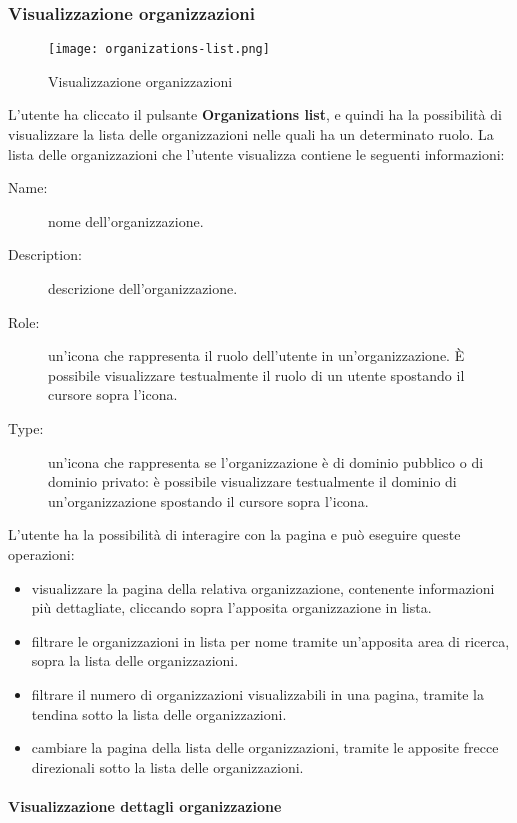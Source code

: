 \documentclass[../manuale-utente.tex]{subfiles}
\begin{document}
\subsubsection{Visualizzazione organizzazioni}%
\label{subs:visualizzazione_organizzazioni}

\begin{figure}[H]
    \centering
    \texttt{[image: organizations-list.png]}
    \caption{Visualizzazione organizzazioni}%
    \label{fig:web_app_visualizzazione_organizzazioni}
\end{figure}
L'utente ha cliccato il pulsante \textbf{Organizations list}, e quindi ha la possibilità di visualizzare la lista delle organizzazioni nelle quali ha un determinato ruolo.
La lista delle organizzazioni che l'utente visualizza contiene le seguenti informazioni:
\begin{description}
    \item[Name:] nome dell'organizzazione.
    \item[Description:] descrizione dell'organizzazione.
    \item[Role:] un'icona che rappresenta il ruolo dell'utente in un'organizzazione. È possibile visualizzare testualmente il ruolo di un utente spostando il cursore sopra l'icona.
    \item[Type:] un'icona che rappresenta se l'organizzazione è di dominio pubblico o di dominio privato: è possibile visualizzare testualmente il dominio di un'organizzazione spostando il cursore sopra l'icona.
\end{description}
L'utente ha la possibilità di interagire con la pagina e può eseguire queste operazioni:
\begin{itemize}
\item visualizzare la pagina della relativa organizzazione, contenente informazioni più dettagliate, cliccando sopra l'apposita organizzazione in lista.
\item filtrare le organizzazioni in lista per nome tramite un'apposita area di ricerca, sopra la lista delle organizzazioni.
\item filtrare il numero di organizzazioni visualizzabili in una pagina, tramite la tendina sotto la lista delle organizzazioni.
\item cambiare la pagina della lista delle organizzazioni, tramite le apposite frecce direzionali sotto la lista delle organizzazioni.
\end{itemize}

\paragraph{Visualizzazione dettagli organizzazione}%
\label{par:visualizzazione_dettagli_organizzazione}
\end{document}
